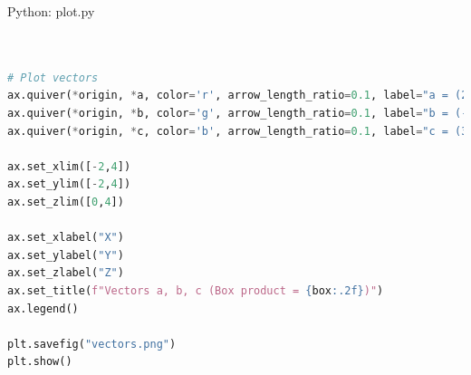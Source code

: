 \documentclass{beamer}
\numberwithin{equation}{section}
\theoremstyle{remark}
\begin{document}
\begin{frame}[fragile]{Python: plot.py}
\begin{lstlisting}[language=Python]


# Plot vectors
ax.quiver(*origin, *a, color='r', arrow_length_ratio=0.1, label="a = (2,1,3)")
ax.quiver(*origin, *b, color='g', arrow_length_ratio=0.1, label="b = (-1,2,1)")
ax.quiver(*origin, *c, color='b', arrow_length_ratio=0.1, label="c = (3,1,2)")

ax.set_xlim([-2,4])
ax.set_ylim([-2,4])
ax.set_zlim([0,4])

ax.set_xlabel("X")
ax.set_ylabel("Y")
ax.set_zlabel("Z")
ax.set_title(f"Vectors a, b, c (Box product = {box:.2f})")
ax.legend()

plt.savefig("vectors.png")
plt.show()


\end{lstlisting}
\end{frame}
\end{document}
